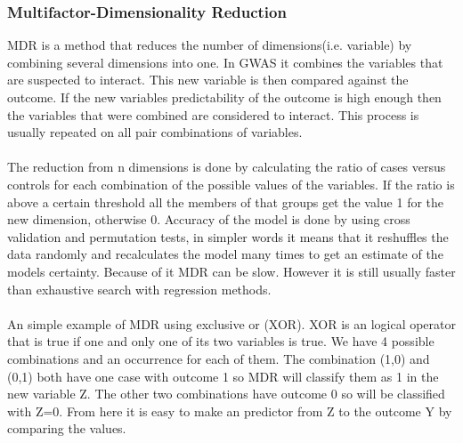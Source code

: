 \documentclass[10pt,a4paper]{report}
\begin{document}
\subsubsection{Multifactor-Dimensionality Reduction}
MDR is a method that reduces the number of dimensions(i.e. variable) by combining several dimensions into one. In GWAS it combines the variables that are suspected to interact. This new variable is then compared against the outcome. If the new variables predictability of the outcome is high enough then the variables that were combined are considered to interact. This process is usually repeated on all pair combinations of variables.\\
\\
The reduction from n dimensions is done by calculating the ratio of cases versus controls for each combination of the possible values of the variables. If the ratio is above a certain threshold all the members of that groups get the value 1 for the new dimension, otherwise 0. Accuracy of the model is done by using cross validation and permutation tests, in simpler words it means that it reshuffles the data randomly and recalculates the model many times to get an estimate of the models certainty. Because of it MDR can be slow. However it is still usually faster than exhaustive search with regression methods.\cite{cordell_detect_review,mdr_2001}\\
\\
An simple example of MDR using exclusive or (XOR). XOR is an logical operator that is true if one and only one of its two variables is true. We have 4 possible combinations and an occurrence for each of them. The combination (1,0) and (0,1) both have one case with outcome 1 so MDR will classify them as 1 in the new variable Z. The other two combinations have outcome 0 so will be classified with Z=0. From here it is easy to make an predictor from Z to the outcome Y by comparing the values.
\end{document}
